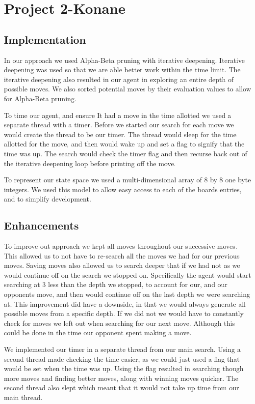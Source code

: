 \documentclass[12pt]{article}
\begin{document}
\section*{Project 2-Konane}

\subsection*{Implementation}
In our approach we used Alpha-Beta pruning with iterative deepening.
Iterative deepening was used so that we are able better work within the time limit.
The iterative deepening also resulted in our agent in exploring an entire depth of possible moves.
We also sorted potential moves by their evaluation values to allow for Alpha-Beta pruning.

To time our agent, and ensure It had a move in the time allotted we used a separate thread with a timer.
Before we started our search for each move we would create the thread to be our timer.
The thread would sleep for the time allotted for the move, and then would wake up and set a flag to signify that the time was up.
The search would check the timer flag and then recurse back out of the iterative deepening loop before printing off the move.

To represent our state space we used a multi-dimensional array of 8 by 8 one byte integers.
We used this model to allow easy access to each of the boards entries, and to simplify development.

\subsection*{Enhancements}
To improve out approach we kept all moves throughout our successive moves.
This allowed us to not have to re-search all the moves we had for our previous moves.
Saving moves also allowed us to search deeper that if we had not as we would continue off on the search we stopped on.
Specifically the agent would start searching at 3 less than the depth we stopped, to account for our, and our opponents move, and then would continue off on the last depth we were searching at.
This improvement did have a downside, in that we would always generate all possible moves from a specific depth.
If we did not we would have to constantly check for moves we left out when searching for our next move.
Although this could be done in the time our opponent spent making a move.

We implemented our timer in a separate thread from our main search.
Using a second thread made checking the time easier, as we could just used a flag that would be set when the time was up.
Using the flag resulted in searching though more moves and finding better moves, along with winning moves quicker.
The second thread also slept which meant that it would not take up time from our main thread.
\end{document}
